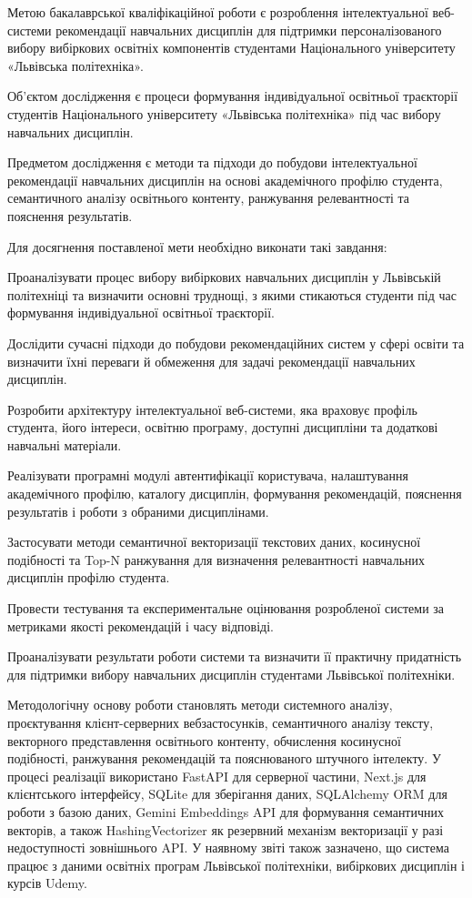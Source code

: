 \documentclass[
]{article}
\begin{document}
Метою бакалаврської кваліфікаційної роботи є розроблення інтелектуальної
веб-системи рекомендації навчальних дисциплін для підтримки
персоналізованого вибору вибіркових освітніх компонентів студентами
Національного університету «Львівська політехніка».

Об'єктом дослідження є процеси формування індивідуальної освітньої
траєкторії студентів Національного університету «Львівська політехніка»
під час вибору навчальних дисциплін.

Предметом дослідження є методи та підходи до побудови інтелектуальної
рекомендації навчальних дисциплін на основі академічного профілю
студента, семантичного аналізу освітнього контенту, ранжування
релевантності та пояснення результатів.

Для досягнення поставленої мети необхідно виконати такі завдання:

Проаналізувати процес вибору вибіркових навчальних дисциплін у
Львівській політехніці та визначити основні труднощі, з якими стикаються
студенти під час формування індивідуальної освітньої траєкторії.

Дослідити сучасні підходи до побудови рекомендаційних систем у сфері
освіти та визначити їхні переваги й обмеження для задачі рекомендації
навчальних дисциплін.

Розробити архітектуру інтелектуальної веб-системи, яка враховує профіль
студента, його інтереси, освітню програму, доступні дисципліни та
додаткові навчальні матеріали.

Реалізувати програмні модулі автентифікації користувача, налаштування
академічного профілю, каталогу дисциплін, формування рекомендацій,
пояснення результатів і роботи з обраними дисциплінами.

Застосувати методи семантичної векторизації текстових даних, косинусної
подібності та Top-N ранжування для визначення релевантності навчальних
дисциплін профілю студента.

Провести тестування та експериментальне оцінювання розробленої системи
за метриками якості рекомендацій і часу відповіді.

Проаналізувати результати роботи системи та визначити її практичну
придатність для підтримки вибору навчальних дисциплін студентами
Львівської політехніки.

Методологічну основу роботи становлять методи системного аналізу,
проєктування клієнт-серверних вебзастосунків, семантичного аналізу
тексту, векторного представлення освітнього контенту, обчислення
косинусної подібності, ранжування рекомендацій та пояснюваного штучного
інтелекту. У процесі реалізації використано FastAPI для серверної
частини, Next.js для клієнтського інтерфейсу, SQLite для зберігання
даних, SQLAlchemy ORM для роботи з базою даних, Gemini Embeddings API
для формування семантичних векторів, а також HashingVectorizer як
резервний механізм векторизації у разі недоступності зовнішнього API. У
наявному звіті також зазначено, що система працює з даними освітніх
програм Львівської політехніки, вибіркових дисциплін і курсів Udemy.
\end{document}
